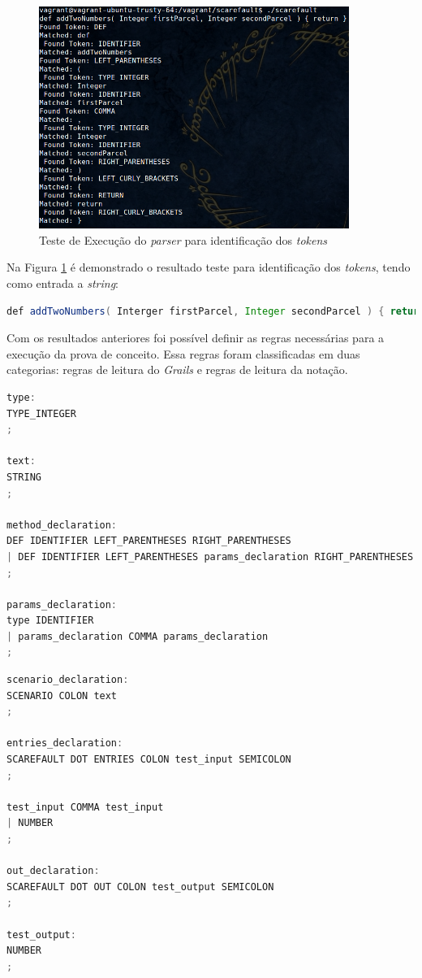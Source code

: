  \begin{figure}[h]
    \centering
    \includegraphics[width=0.9\textwidth]{figuras/second-test-grammar.png}
    \caption{Teste de Execução do \textit{parser} para identificação dos \textit{tokens}}
    \label{fig:test-tokens}
 \end{figure}
\par
\indent Na Figura \ref{fig:test-tokens} é demonstrado o resultado teste para identificação dos \textit{tokens}, tendo como entrada a \textit{string}:
\par
\begin{lstlisting}[language=java, label=string-entry, caption=\textit{string} de entrada]
def addTwoNumbers( Interger firstParcel, Integer secondParcel ) { return }
\end{lstlisting}
\par
\indent Com os resultados anteriores foi possível definir as regras necessárias para a execução da prova de conceito. Essa regras foram classificadas em duas categorias: regras de leitura do \textit{Grails} e regras de leitura da notação.
\par
\begin{lstlisting}[language=C++, label=rules-grails, caption=Regras de Leitura do \textit{Grails}]
type:
TYPE_INTEGER
;

text:
STRING
;

method_declaration:
DEF IDENTIFIER LEFT_PARENTHESES RIGHT_PARENTHESES
| DEF IDENTIFIER LEFT_PARENTHESES params_declaration RIGHT_PARENTHESES
;

params_declaration:
type IDENTIFIER
| params_declaration COMMA params_declaration
;
\end{lstlisting}
\par 
\begin{lstlisting}[language=C++, label=rules-scarefault, caption=Regras de Leitura da notação]
scenario_declaration:
SCENARIO COLON text
;

entries_declaration:
SCAREFAULT DOT ENTRIES COLON test_input SEMICOLON
;

test_input COMMA test_input
| NUMBER
;

out_declaration:
SCAREFAULT DOT OUT COLON test_output SEMICOLON
;

test_output:
NUMBER
;
\end{lstlisting}
